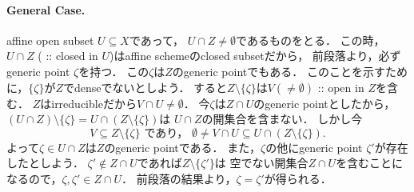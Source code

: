 \documentclass[a4paper]{jsarticle}
\begin{document}
    \paragraph{General Case.}
    affine open subset $U \subseteq X$であって，
    $U \cap Z \neq \emptyset$であるものをとる．
    この時，$U \cap Z$ ( :: closed in $U$)はaffine schemeのclosed subsetだから，
    前段落より，必ずgeneric point $\zeta$を持つ．
    この$\zeta$は$Z$のgeneric pointでもある．
    このことを示すために，$\{\zeta\}$が$Z$でdenseでないとしよう．
    すると$Z \setminus \{\zeta\}$は$V (\neq \emptyset)$ :: open in $Z$を含む．
    $Z$はirreducibleだから$V \cap U \neq \emptyset$．
    今$\zeta$は$Z \cap U$のgeneric pointとしたから，
    $(U \cap Z) \setminus \{\zeta\}=U \cap (Z \setminus \{\zeta\})$は
    $U \cap Z$の開集合を含まない．
    しかし今
    \[
        V \subseteq Z \setminus \{\zeta\}
        \text{ であり， }
        \emptyset \neq V \cap U \subseteq U \cap (Z \setminus \{\zeta\}).
    \]
    よって$\zeta \in U \cap Z$は$Z$のgeneric pointである．
    また，$\zeta$の他にgeneric point $\zeta'$が存在したとしよう．
    $\zeta' \not \in Z \cap U$であれば$Z \setminus \{\zeta'\}$は
    空でない開集合$Z \cap U$を含むことになるので，$\zeta, \zeta' \in Z \cap U$．
    前段落の結果より，$\zeta=\zeta'$が得られる．



\end{document}
